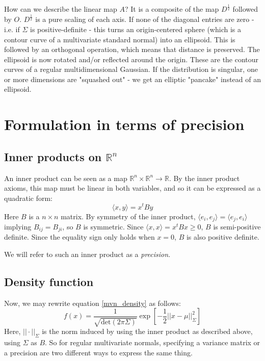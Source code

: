 \documentclass[12pt, a4paper]{article}
\numberwithin{equation}{section}
\begin{document}
How can we describe the linear map $A$? It is a composite of the map $D^{\frac{1}{2}}$ followed by $O$. $D^{\frac{1}{2}}$ is a pure scaling of each axis. If none of the diagonal entries are zero - i.e. if $\Sigma$ is positive-definite - this turns an origin-centered sphere (which is a contour curve of a multivariate standard normal) into an ellipsoid. This is followed by an orthogonal operation, which means that distance is preserved. The ellipsoid is now rotated and/or reflected around the origin. These are the contour curves of a regular multidimensional Gaussian. If the distribution is singular, one or more dimensions are "squashed out" - we get an elliptic "pancake" instead of an ellipsoid.

\section{Formulation in terms of precision}

\subsection{Inner products on $\mathbb{R}^n$}
An inner product can be seen as a map $\mathbb{R}^n\times\mathbb{R}^n\rightarrow\mathbb{R}$. By the inner product axioms, this map must be linear in both variables, and so it can be expressed as a quadratic form:
\begin{equation}
\langle x,y\rangle=x^t By
\end{equation}
Here $B$ is a $n\times n$ matrix. By symmetry of the inner product, $\langle e_i,e_j\rangle=\langle e_j,e_i\rangle$ implying $B_{ij}=B_{ji}$, so $B$ is symmetric. Since $\langle x,x\rangle=x^t Bx\ge 0$, $B$ is semi-positive definite. Since the equality sign only holds when $x=0$, $B$ is also positive definite.

We will refer to such an inner product as a \textit{precision}.

\subsection{Density function}
Now, we may rewrite equation \ref{mvn_density} as follows:
\begin{equation}
f(x)=\frac{1}{\sqrt{\textrm{det}(2\pi\Sigma)}}\exp\left[-\frac{1}{2}||x-\mu||_\Sigma^2\right]
\end{equation}
Here, $||\cdot||_\Sigma$ is the norm induced by using the inner product as described above, using $\Sigma$ as $B$. So for regular multivariate normals, specifying a variance matrix or a precision are two different ways to express the same thing.
\end{document}
